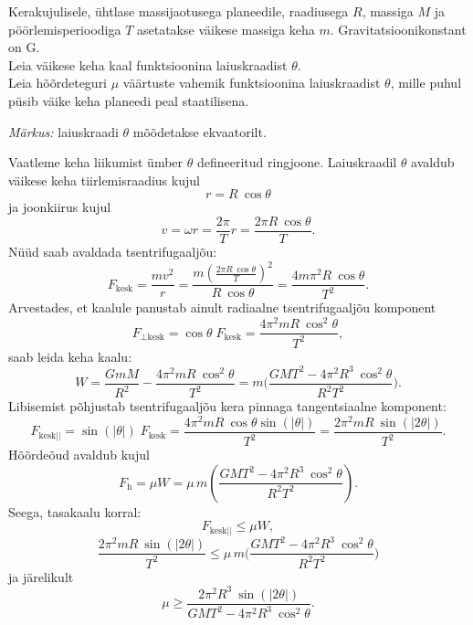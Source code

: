 
Kerakujulisele, ühtlase massijaotusega planeedile, raadiusega $R$, massiga $M$ ja pöörlemisperioodiga $T$ asetatakse väikese massiga keha $m$. Gravitatsioonikonstant on G.\\
\osa Leia väikese keha kaal funktsioonina laiuskraadist $\theta$.\\
\osa Leia hõõrdeteguri $\mu$ väärtuste vahemik funktsioonina laiuskraadist $\theta$, mille puhul püsib väike keha planeedi peal staatilisena. \par
\emph{Märkus:} laiuskraadi $\theta$ mõõdetakse ekvaatorilt.


\hint

\solu
\osa Vaatleme keha liikumist ümber $\theta$ defineeritud ringjoone. Laiuskraadil $\theta$ avaldub väikese keha tiirlemisraadius kujul
\[
  r=R \: \cos \theta
\]
ja joonkiirus kujul
\[
  v= \omega r= \frac{2 \pi }{T} r = \frac{2 \pi R \: \cos \theta}{T}.
\]
Nüüd saab avaldada tsentrifugaaljõu:
\[
  F_{\mathrm{ kesk}}=\frac{m v^2}{r} =\frac{m \left(\frac{2 \pi R \: \cos \theta}{T}\right)^2}{R \: \cos \theta}=\frac{4 m \pi^2 R \: \cos \theta}{T^2}.
\]
Arvestades, et kaalule panustab ainult radiaalne tsentrifugaaljõu komponent
\[
  F_{\mathrm{\bot kesk}}= \cos \theta \; F_{\mathrm{ kesk}} = \frac{4 \pi^2 m R \: \cos ^2 \theta}{T^2},
\]
saab leida keha kaalu:
\[
  W=\frac{G m M}{R^2} - \frac{4 \pi^2 m R \: \cos ^2 \theta}{T^2} = m\bigg(\frac{G M T^2 - 4 \pi^2 R^3 \: \cos ^2 \theta }{R^2 T^2}\bigg).
\]
\osa Libisemist põhjustab tsentrifugaaljõu kera pinnaga tangentsiaalne komponent:
\[
  F_{\mathrm{kesk || }}= \sin(|\theta|) \; F_{\mathrm{ kesk}} = \frac{4 \pi^2 m R \: \cos \theta \sin(|\theta|)}{T^2}=\frac{2 \pi^2 m R \: \sin(|2\theta|)}{T^2} .
\]
Hõõrdeõud avaldub kujul
\[
  F_{\mathrm{h}}=\mu W = \mu \, m\left(\frac{G M T^2 - 4 \pi^2 R^3 \: \cos ^2 \theta }{R^2 T^2}\right).
\]
Seega, tasakaalu korral:
\[
  F_{\mathrm{kesk || }} \leq \mu W,
\]
\[
  \frac{2 \pi^2 m R \: \sin(|2\theta|)}{T^2} \leq
  \mu \, m\bigg(\frac{G M T^2 - 4 \pi^2 R^3 \: \cos ^2 \theta }{R^2 T^2}\bigg)
\]
ja järelikult
\[
  \mu \geq \frac{2 \pi^2 R^3 \: \sin(|2\theta|)}{G M T^2 - 4 \pi^2 R^3 \: \cos ^2 \theta }.
\]
\probend
